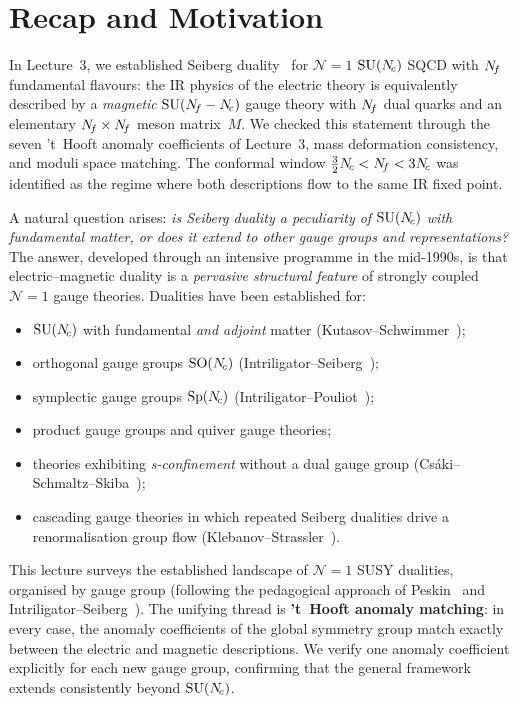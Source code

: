 \documentclass[11pt,a4paper]{article}
\newcommand{\SO}[1]{\mathrm{SO}(#1)}
\newcommand{\Sp}[1]{\mathrm{Sp}(#1)}
\begin{document}
\section{Recap and Motivation}
\label{sec:recap-motivation}

In Lecture~3, we established Seiberg duality~\cite{Seiberg1995} for
$\mathcal{N}=1$ $\mathrm{SU}(N_{\!c})$ SQCD with $N_{\!f}$ fundamental flavours: the
IR physics of the electric theory is equivalently described by a
\emph{magnetic} $\mathrm{SU}(N_{\!f} - N_{\!c})$ gauge theory with $N_{\!f}$ dual quarks
and an elementary $N_{\!f} \times N_{\!f}$ meson matrix~$M$.
We checked this statement through the seven 't~Hooft anomaly
coefficients of Lecture~3, mass deformation consistency, and moduli
space matching.
The conformal window $\tfrac{3}{2}N_{\!c} < N_{\!f} < 3N_{\!c}$ was identified as
the regime where both descriptions flow to the same IR fixed point.

A natural question arises: \emph{is Seiberg duality a peculiarity of
$\mathrm{SU}(N_{\!c})$ with fundamental matter, or does it extend to other gauge
groups and representations?}  The answer, developed through an
intensive programme in the mid-1990s, is that electric--magnetic
duality is a \emph{pervasive structural feature} of strongly coupled
$\mathcal{N}=1$ gauge theories.  Dualities have been established for:
\begin{itemize}
  \item $\mathrm{SU}(N_{\!c})$ with fundamental \emph{and adjoint} matter
    (Kutasov--Schwimmer~\cite{KS9505004});
  \item orthogonal gauge groups $\SO{\Nc}$
    (Intriligator--Seiberg~\cite{IS9503179});
  \item symplectic gauge groups $\Sp{\Nc}$
    (Intriligator--Pouliot~\cite{IP9505006});
  \item product gauge groups and quiver gauge theories;
  \item theories exhibiting \emph{s-confinement} without a dual gauge
    group (Cs\'aki--Schmaltz--Skiba~\cite{CSS9610139});
  \item cascading gauge theories in which repeated Seiberg dualities
    drive a renormalisation group flow
    (Klebanov--Strassler~\cite{KlebanovStrassler2000}).
\end{itemize}

This lecture surveys the established landscape of $\mathcal{N}=1$ SUSY
dualities, organised by gauge group (following the pedagogical approach
of Peskin~\cite{Peskin1997} and Intriligator--Seiberg~\cite{IS1995}).
The unifying thread is
\textbf{'t~Hooft anomaly matching}: in every case, the anomaly
coefficients of the global symmetry group match exactly between the
electric and magnetic descriptions.  We verify one anomaly coefficient
explicitly for each new gauge group, confirming that the general
framework extends consistently beyond $\mathrm{SU}(N_{\!c})$.
\end{document}
